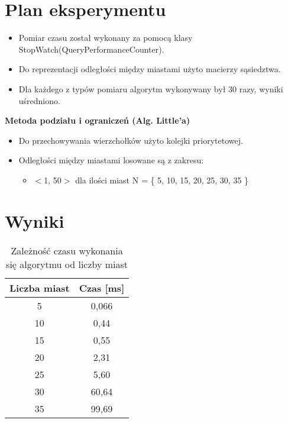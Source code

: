 \documentclass{article}
\begin{document}
\section{Plan eksperymentu}
\par
\begin{itemize}
\item Pomiar czasu został wykonany za pomocą klasy StopWatch(QueryPerformanceCounter).
\item Do reprezentacji odległości między miastami użyto macierzy sąsiedztwa.
\item Dla każdego z typów pomiaru algorytm wykonywany był 30 razy, wyniki uśredniono.
\end{itemize}

\textbf{Metoda podziału i ograniczeń (Alg. Little’a)}
\renewcommand\labelitemii{$\circ$}
\begin{itemize}
	\item Do przechowywania wierzchołków użyto kolejki priorytetowej.
	\item Odległości między miastami losowane są  z zakresu:
	\begin{itemize}
	\item $<$1, 50$>$ dla ilości miast N = \{ 5, 10, 15, 20, 25, 30, 35 \}
	\end{itemize}
\end{itemize}
\newpage

\section{Wyniki}


\begin{table}[H]
	\vspace{1cm}
	\centering
	
	\begin{tabular}{|c|c|}
		\hline
		\multicolumn{1}{|c|}{\textbf{Liczba miast}} & \textbf{Czas [ms]}  \\ \hline
				{5}                                	& 0,066               \\ \hline
				{10}                                & 0,44               \\ \hline
				{15}                                & 0,55                 \\ \hline
				{20}                                & 2,31                 \\ \hline
				{25}                                & 5,60                 \\ \hline
				{30}                                & 60,64                 \\ \hline
				{35}                                & 99,69                 \\ \hline
			
	\end{tabular}
	\caption{Zależność czasu wykonania się algorytmu od liczby miast}
\end{table}	
\end{document}
